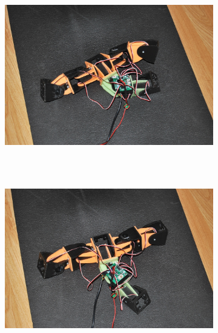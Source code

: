 \begin{figure}[h]
		\centering
        \begin{subfigure}[b]{0.31\textwidth}
                \centering
                \includegraphics[width=\textwidth]{images/results_7_real_gait_01.jpg}
                 \\~
        \end{subfigure}
        ~
        \begin{subfigure}[b]{0.31\textwidth}
                \centering
                \includegraphics[width=\textwidth]{images/results_7_real_gait_02.jpg}
                 \\~
        \end{subfigure}
        ~
        \begin{subfigure}[b]{0.31\textwidth}
         	   \centering

\end{subfigure}
\end{figure}
